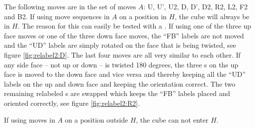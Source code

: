 The following moves are in the set of moves $A$: U, U', U2, D, D', D2, R2, L2, F2 and B2. If using move sequences in $A$ on a position in $H$, the cube will always be in $H$. The reason for this can easily be tested with a \rubik{}. If using one of the three up face moves or one of the three down face moves, the ``FB'' labels are not moved and the ``UD'' labels are simply rotated on the face that is being twisted, see figure \ref{fig:relabel2:D}. The last four moves are all very similar to each other. If any side face -- not up or down -- is twisted 180 degrees, the three \facelet{}s on the up face is moved to the down face and vice versa and thereby keeping all the ``UD'' labels on the up and down face and keeping the orientation correct. The two remaining relabeled \facelet{}s are swapped which keeps the ``FB'' labels placed and oriented correctly, see figure \ref{fig:relabel2:R2}.

\begin{figure}[htb]
	\centering
	\vspace{0.1\textwidth}
	\caption{}
	\label{fig:relabel2}
\end{figure}


If using moves in $A$ on a position outside $H$, the cube can not enter $H$.

